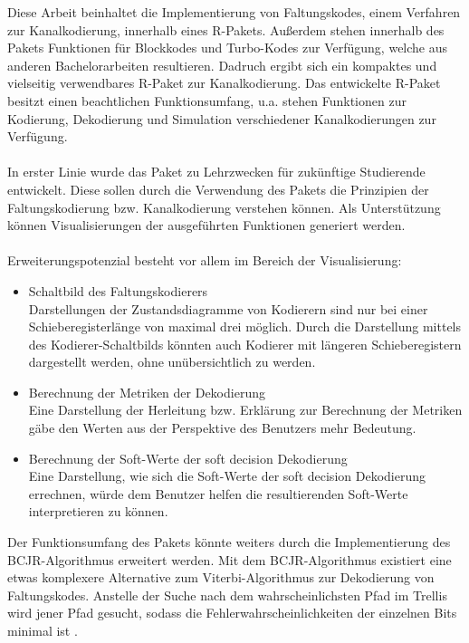 Diese Arbeit beinhaltet die Implementierung von Faltungskodes, einem Verfahren zur Kanalkodierung, innerhalb eines R-Pakets. Außerdem stehen innerhalb des Pakets Funktionen für Blockkodes und Turbo-Kodes zur Verfügung, welche aus anderen Bachelorarbeiten resultieren. Dadruch ergibt sich ein kompaktes und vielseitig verwendbares R-Paket zur Kanalkodierung. Das entwickelte R-Paket besitzt einen beachtlichen Funktionsumfang, u.a. stehen Funktionen zur Kodierung, Dekodierung und Simulation verschiedener Kanalkodierungen zur Verfügung.
\\
\\
In erster Linie wurde das Paket zu Lehrzwecken für zukünftige Studierende entwickelt. Diese sollen durch die Verwendung des Pakets die Prinzipien der Faltungskodierung bzw. Kanalkodierung verstehen können. Als Unterstützung können Visualisierungen der ausgeführten Funktionen generiert werden.
\\
\\
Erweiterungspotenzial besteht vor allem im Bereich der Visualisierung:
\begin{itemize}
\item Schaltbild des Faltungskodierers\\Darstellungen der Zustandsdiagramme von Kodierern sind nur bei einer Schieberegisterlänge von maximal drei möglich. Durch die Darstellung mittels des Kodierer-Schaltbilds könnten auch Kodierer mit längeren Schieberegistern dargestellt werden, ohne unübersichtlich zu werden.
\item Berechnung der Metriken der Dekodierung\\Eine Darstellung der Herleitung bzw. Erklärung zur Berechnung der Metriken gäbe den Werten aus der Perspektive des Benutzers mehr Bedeutung.
\item Berechnung der Soft-Werte der soft decision Dekodierung\\Eine Darstellung, wie sich die Soft-Werte der soft decision Dekodierung errechnen, würde dem Benutzer helfen die resultierenden Soft-Werte interpretieren zu können.
\end{itemize}
Der Funktionsumfang des Pakets könnte weiters durch die Implementierung des BCJR-Algorithmus erweitert werden. Mit dem BCJR-Algorithmus existiert eine etwas komplexere Alternative zum Viterbi-Algorithmus zur Dekodierung von Faltungskodes. Anstelle der Suche nach dem wahrscheinlichsten Pfad im Trellis wird jener Pfad gesucht, sodass die Fehlerwahrscheinlichkeiten der einzelnen Bits minimal ist \cite[S. 233 ff.]{schonfeld2012informations}.